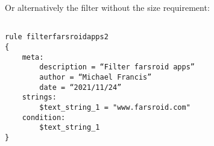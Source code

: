 Or alternatively the filter without the size requirement:
\begin{verbatim}

rule filterfarsroidapps2
{
    meta:
        description = “Filter farsroid apps”
        author = “Michael Francis”
        date = “2021/11/24”
    strings:
        $text_string_1 = "www.farsroid.com"
    condition:
        $text_string_1
}

\end{verbatim}

